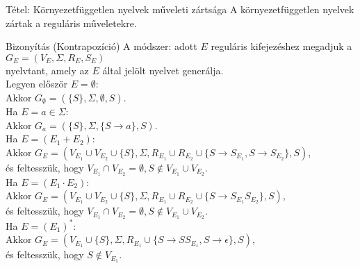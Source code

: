 \documentclass{beamer}
\begin{document}
\begin{frame}
\begin{block}{Tétel: Környezetfüggetlen nyelvek műveleti zártsága}
A környezetfüggetlen nyelvek zártak a reguláris műveletekre.
\end{block}

\begin{block}{Bizonyítás (Kontrapozíció)}
A módszer: adott $E$ reguláris kifejezéshez megadjuk a\\
$G_E = (V_E, {\Sigma}, R_E, S_E)$\\
nyelvtant, amely az $E$ által jelölt nyelvet generálja.\\
\bigskip
Legyen először $E = \emptyset$:\\
Akkor $G_{\emptyset} = (\{S\}, {\Sigma}, \emptyset, S)$.\\
\bigskip
Ha $E = a \in {\Sigma}$:\\
Akkor $G_a = (\{S\}, {\Sigma}, \{S \rightarrow a\}, S)$.\\
\bigskip
Ha $E = (E_1 + E_2)$:\\
Akkor $G_E = (V_{E_1} \cup V_{E_2} \cup \{S\}, \Sigma, R_{E_1} \cup R_{E_2} \cup \{S \rightarrow S_{E_1}, S \rightarrow S_{E_2}\}, S)$,\\
és feltesszük, hogy $V_{E_1} \cap V_{E_2} = {\emptyset}, S \notin V_{E_1} \cup V_{E_2}$.\\
\bigskip
Ha $E = (E_1 \cdot E_2)$:\\
Akkor $G_E = (V_{E_1} \cup V_{E_2} \cup \{S\}, \Sigma, R_{E_1} \cup R_{E_2} \cup \{S \rightarrow S_{E_1}S_{E_2}\}, S)$,\\
és feltesszük, hogy $V_{E_1} \cap V_{E_2} = {\emptyset}, S \notin V_{E_1} \cup V_{E_2}$.\\
\bigskip
Ha $E = (E_1)^*$:\\
Akkor $G_E = (V_{E_1} \cup \{S\}, \Sigma, R_{E_1} \cup \{S \rightarrow SS_{E_1}, S \rightarrow \epsilon \}, S)$,\\
és feltesszük, hogy $S \notin V_{E_1}$.\\

\end{block}
\end{frame}
\end{document}

